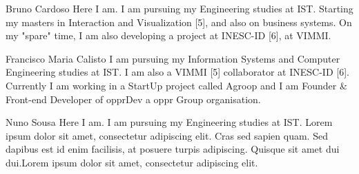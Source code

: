 \documentclass[a4paper,12pt,journal,twoside,compsoc]{PPIEEEtran}
\begin{document}

%
% 
\begin{IEEEbiography}{Bruno Cardoso}
Here I am. I am pursuing my Engineering studies at \ac{IST}. Starting my masters in Interaction and Visualization [5], and also on business systems. On my "spare" time, I am also developing a project at INESC-ID [6], at VIMMI.
\end{IEEEbiography}
\begin{IEEEbiography}
{Francisco Maria Calisto}
I am pursuing my Information Systems and Computer  Engineering studies at \ac{IST}. I am also a VIMMI [5] collaborator at INESC-ID [6]. Currently I am working in a StartUp project called Agroop and I am Founder \& Front-end Developer of opprDev a oppr Group organisation.
\end{IEEEbiography}
\begin{IEEEbiography}
{Nuno Sousa}
Here I am. I am pursuing my Engineering studies at \ac{IST}. Lorem ipsum dolor sit amet, consectetur adipiscing elit. Cras sed sapien quam. Sed dapibus est id enim facilisis, at posuere turpis adipiscing. Quisque sit amet dui dui.Lorem ipsum dolor sit amet, consectetur adipiscing elit. 
\end{IEEEbiography}
\end{document}
